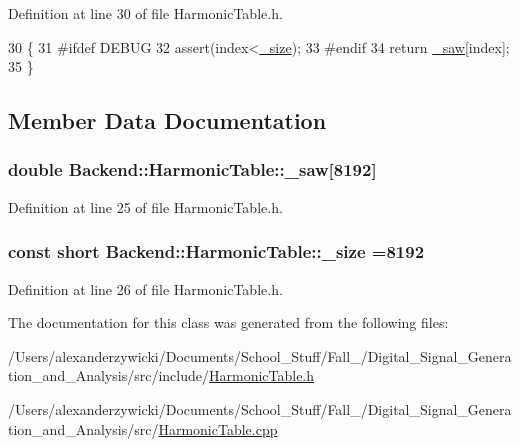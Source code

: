 Definition at line 30 of file Harmonic\+Table.\+h.


\begin{DoxyCode}
30                                                                   \{
31 \textcolor{preprocessor}{#ifdef DEBUG}
32     assert(index<\hyperlink{classBackend_1_1HarmonicTable_a94c9f17b8fd4b514d145fbb8b0ed63dd}{\_size});
33 \textcolor{preprocessor}{#endif}
34     \textcolor{keywordflow}{return} \hyperlink{classBackend_1_1HarmonicTable_a464db802494a562d2c9d0840ee6d1483}{\_saw}[index];
35 \}
\end{DoxyCode}


\subsection{Member Data Documentation}
\hypertarget{classBackend_1_1HarmonicTable_a464db802494a562d2c9d0840ee6d1483}{
\subsubsection[{\+\_\+saw}]{\setlength{\rightskip}{0pt plus 5cm}double Backend\+::\+Harmonic\+Table\+::\+\_\+saw\mbox{[}8192\mbox{]}\hspace{0.3cm}{\ttfamily [protected]}}}\label{classBackend_1_1HarmonicTable_a464db802494a562d2c9d0840ee6d1483}


Definition at line 25 of file Harmonic\+Table.\+h.

\hypertarget{classBackend_1_1HarmonicTable_a94c9f17b8fd4b514d145fbb8b0ed63dd}{
\subsubsection[{\+\_\+size}]{\setlength{\rightskip}{0pt plus 5cm}const short Backend\+::\+Harmonic\+Table\+::\+\_\+size =8192\hspace{0.3cm}{\ttfamily [protected]}}}\label{classBackend_1_1HarmonicTable_a94c9f17b8fd4b514d145fbb8b0ed63dd}


Definition at line 26 of file Harmonic\+Table.\+h.



The documentation for this class was generated from the following files\+:\begin{DoxyCompactItemize}
\item 
/\+Users/alexanderzywicki/\+Documents/\+School\+\_\+\+Stuff/\+Fall\+\_/\+Digital\+\_\+\+Signal\+\_\+\+Generation\+\_\+and\+\_\+\+Analysis/src/include/\hyperlink{HarmonicTable_8h}{Harmonic\+Table.\+h}\item 
/\+Users/alexanderzywicki/\+Documents/\+School\+\_\+\+Stuff/\+Fall\+\_/\+Digital\+\_\+\+Signal\+\_\+\+Generation\+\_\+and\+\_\+\+Analysis/src/\hyperlink{HarmonicTable_8cpp}{Harmonic\+Table.\+cpp}\end{DoxyCompactItemize}
